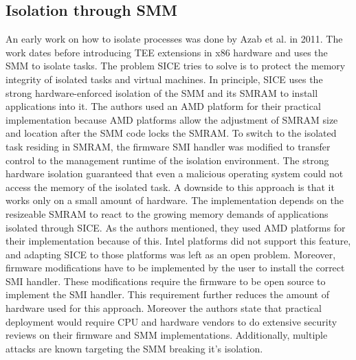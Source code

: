 \subsection{Isolation through SMM}
\label{sec:20:isolation_smm}
An early work on how to isolate processes was done by Azab et al. in
2011.\cite{azab_sice_2011} The work dates before introducing TEE extensions in
x86 hardware and uses the SMM to isolate tasks. The problem SICE tries to solve
is to protect the memory integrity of isolated tasks and virtual machines. In
principle, SICE uses the strong hardware-enforced isolation of the SMM and its
SMRAM to install applications into it. The authors used an AMD platform for
their practical implementation because AMD platforms allow the adjustment of
SMRAM size and location after the SMM code locks the SMRAM.\cite{bios2014amd} To
switch to the isolated task residing in SMRAM, the firmware SMI handler was
modified to transfer control to the management runtime of the isolation
environment. The strong hardware isolation guaranteed that even a malicious
operating system could not access the memory of the isolated task. A downside to
this approach is that it works only on a small amount of hardware. The
implementation depends on the resizeable SMRAM to react to the growing memory
demands of applications isolated through SICE. As the authors mentioned, they
used AMD platforms for their implementation because of this. Intel platforms did
not support this feature, and adapting SICE to those platforms was left as an
open problem. Moreover, firmware modifications have to be implemented by the
user to install the correct SMI handler. These modifications require the
firmware to be open source to implement the SMI handler. This requirement
further reduces the amount of hardware used for this approach. Moreover the
authors state that practical deployment would require CPU and hardware vendors
to do extensive security reviews on their firmware and SMM implementations.
Additionally, multiple attacks are known targeting the SMM breaking it's
isolation.\cite{wojtczuk2014attacking, wojtczuk2009attacking, wojtczuk2009poisining}

